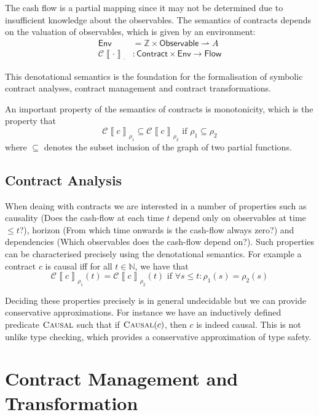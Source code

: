\documentclass[a4paper,debug,twocolumn]{easychair}
\newcommand{\comm}[3][red]{{\small \color{#1}{$\spadesuit$#2: #3}}}
\newcommand{\pbcomment}[1]{\comm[green]{pb}{#1}}
\newcommand\type[1]{\mathsf{#1}}
\newcommand\nats{{\mathbb N}}
\newcommand\ints{{\mathbb Z}}
\newcommand\pto{\rightharpoonup}
\newcommand\cSem[2]{{\mathcal C}\left\llbracket#1\right\rrbracket_{#2}}
\newcommand\Pred[1]{\textsc{#1}}
\theoremstyle{plain}
\begin{document}
The cash flow is a partial mapping since it may not be determined due
to insufficient knowledge about the observables. The semantics of
contracts depends on the valuation of observables, which is given by
an environment:
\begin{align*}
  \type{Env} &= \ints \times \type{Observable} \pto A\\
  \cSem{\cdot}{\cdot}&\colon \type{Contract} \times \type{Env} \to
  \type{Flow}
\end{align*}

This denotational semantics is the foundation for the formalisation of
symbolic contract analyses, contract management and contract
transformations.

An important property of the semantics of contracts is monotonicity,
which is the property that
\[
\cSem c {\rho_1} \subseteq \cSem c {\rho_2} \text{ if }
\rho_1\subseteq \rho_2
\]
where $\subseteq$ denotes the subset inclusion of the graph of two
partial functions.

\subsection{Contract Analysis}
\label{sec:contract-analysis}

When deaing with contracts we are interested in a number of properties
such as causality (Does the cash-flow at each time $t$ depend only on
observables at time $\leq t$?), horizon (From which time onwards is
the cash-flow always zero?) and dependencies (Which observables does
the cash-flow depend on?). Such properties can be characterised
precisely using the denotational semantics. For example a contract $c$
is causal iff for all $t \in \nats$, we have that
\[
\cSem c{\rho_1} (t) = \cSem c {\rho_2} (t) \text{ if } \forall s \le t\colon
\rho_1(s)=\rho_2(s)
\]


Deciding these properties precisely is in general undecidable but we
can provide conservative approximations.  For instance we have an
inductively defined predicate $\Pred{Causal}$ such that if
$\Pred{Causal}(c)$, then $c$ is indeed causal. This is not unlike type
checking, which provides a conservative approximation of type safety.


\section{Contract Management and Transformation}
\label{sec:contract-management}

\pbcomment{What do we precisely mean by contract management?}
\end{document}
